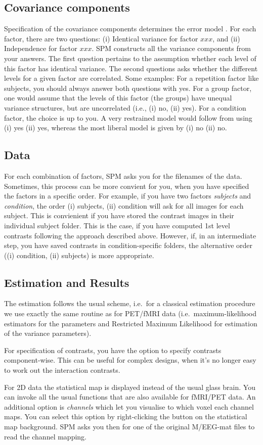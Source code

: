 \subsection{Covariance components}
Specification of the covariance components determines the error
model \cite{daniel_hbf2}. For each factor, there are two questions:
(i) Identical variance for
factor $xxx$, and (ii) Independence for factor $xxx$. SPM constructs all the
variance components from your answers. The first question pertains to
the assumption whether each level of this factor has identical
variance. The second questions asks whether the different levels for a
given factor are correlated. Some examples: For a repetition factor
like subjects, you should always answer both questions with yes. For a
group factor, one would assume that the levels of this factor (the
groups) have unequal variance structures, but are uncorrelated (i.e.,
(i) no, (ii) yes). For a condition factor, the choice is up to
you. A very restrained model would follow from using (i) yes (ii)
yes, whereas the most liberal model is given by (i) no (ii) no. 

\subsection{Data}
For each combination of factors, SPM asks you for the filenames of the
data. Sometimes, this process can be more convient for you, when you
have specified the factors in a specific order. For example, if you
have two factors \textit{subjects} and \textit{condition}, the order
(i) subjects, (ii) condition will ask for all images for each
subject. This is convienient if you have stored the contrast images
in their individual subject folder. This is the case, if you
have computed 1st level contrasts following the approach described
above. However, if, in an intermediate step, you have saved contrasts
in condition-specific folders, the alternative order ((i) condition, (ii)
subjects) is more appropriate.

\subsection{Estimation and Results}
The estimation follows the usual scheme, i.e.~for a classical
estimation procedure we use exactly the same routine as for PET/fMRI
data (i.e.~maximum-likelihood estimators for the parameters and Restricted 
Maximum Likelihood for estimation of the variance parameters).

For specification of contrasts, you have the option to specify
contrasts component-wise. This can be useful for complex designs, when
it's no longer easy to work out the interaction contrasts.

For 2D data the statistical map is displayed instead of the usual
glass brain. You can invoke all the usual functions that are also
available for fMRI/PET data. An additional option is \textit{channels}
which let you visualise to which voxel each channel maps. You can
select this option by right-clicking the button on the statistical 
map background. SPM asks you then for one of the original M/EEG-mat
files to read the channel mapping.

